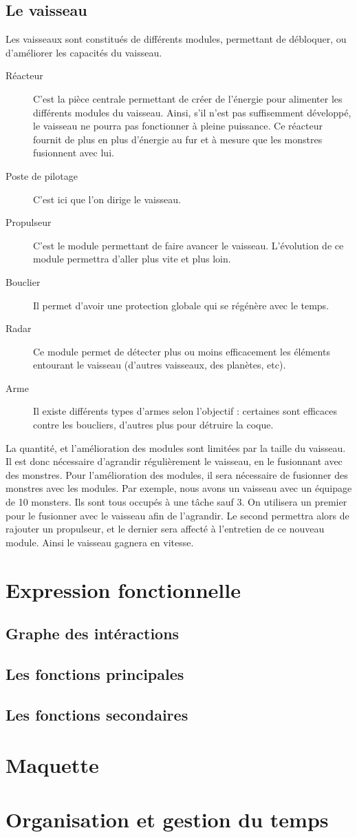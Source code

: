 \documentclass[a4paper,11pt]{report}
\begin{document}
    \section{Le vaisseau}
      Les vaisseaux sont constitués de différents modules, permettant de débloquer, ou d'améliorer les capacités du vaisseau.
      \begin{description}
        \item[Réacteur] C'est la pièce centrale permettant de créer de l'énergie pour alimenter les différents modules du vaisseau. Ainsi, s'il n'est pas suffisemment développé, le vaisseau ne pourra pas fonctionner à pleine puissance. Ce réacteur fournit de plus en plus d'énergie au fur et à mesure que les monstres fusionnent avec lui.
        \item[Poste de pilotage] C'est ici que l'on dirige le vaisseau.
        \item[Propulseur] C'est le module permettant de faire avancer le vaisseau. L'évolution de ce module permettra d'aller plus vite et plus loin.
        \item[Bouclier] Il permet d'avoir une protection globale qui se régénère avec le temps.
        \item[Radar] Ce module permet de détecter plus ou moins efficacement les éléments entourant le vaisseau (d'autres vaisseaux, des planètes, etc).
        \item[Arme] Il existe différents types d'armes selon l'objectif : certaines sont efficaces contre les boucliers, d'autres plus pour détruire la coque.
      \end{description}
      La quantité, et l'amélioration des modules sont limitées par la taille du vaisseau. Il est donc nécessaire d'agrandir régulièrement le vaisseau, en le fusionnant avec des monstres.
      Pour l'amélioration des modules, il sera nécessaire de fusionner des monstres avec les modules. Par exemple, nous avons un vaisseau avec un équipage de 10 monsters. Ils sont tous occupés à une tâche sauf 3. On utilisera un premier pour le fusionner avec le vaisseau afin de l'agrandir. Le second permettra alors de rajouter un propulseur, et le dernier sera affecté à l'entretien de ce nouveau module. Ainsi le vaisseau gagnera en vitesse.

\chapter{Expression fonctionnelle}
    \section{Graphe des intéractions}

    \section{Les fonctions principales}

    \section{Les fonctions secondaires}
    
    
\chapter{Maquette}


\chapter{Organisation et gestion du temps}
\end{document}
